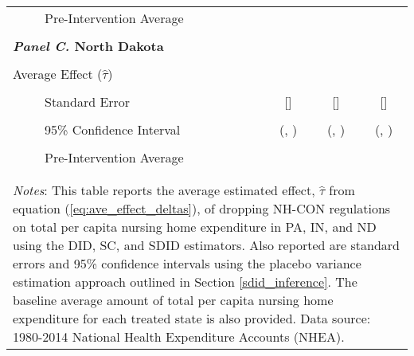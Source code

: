 \documentclass[../Main.tex]{subfiles}
\begin{document}
\begin{table}[htbp]
\begin{tabular}{l*{3}{c}}
\\[-2ex]
\multicolumn{1}{l}{\ \ \ \ \ Pre-Intervention Average}&   \multicolumn{3}{c}{}\\
\\[-.1ex]
\multicolumn{4}{l}{\textbf{\textit{Panel C.} North Dakota}}\\
\\[-1.5ex]
\multicolumn{1}{l}{Average Effect ($\hat{\tau}$)}&   \multicolumn{1}{c}{}&   \multicolumn{1}{c}{}&  \multicolumn{1}{c}{}\\
\\[-2ex]
\multicolumn{1}{l}{\ \ \ \ \ Standard Error}  &\multicolumn{1}{c}{[]}&\multicolumn{1}{c}{[]}&\multicolumn{1}{c}{[]}\\
\\[-2ex]
\multicolumn{1}{l}{\ \ \ \ \ 95\% Confidence Interval}&   \multicolumn{1}{c}{(, )}&   \multicolumn{1}{c}{(, )}&   \multicolumn{1}{c}{(, )}\\
\\[-2ex]
\multicolumn{1}{l}{\ \ \ \ \ Pre-Intervention Average}&   \multicolumn{3}{c}{}\\
\\[-.1ex]
\hline\hline
\\[-2ex]
\multicolumn{4}{p{.69\linewidth}}{\footnotesize \textit{Notes}: This table reports the average estimated effect, $\hat{\tau}$ from equation (\ref{eq:ave_effect_deltas}), of dropping NH-CON regulations on total per capita nursing home expenditure in PA, IN, and ND using the DID, SC, and SDID estimators. Also reported are standard errors and 95\% confidence intervals using the placebo variance estimation approach outlined in Section \ref{sdid_inference}. The baseline average amount of total per capita nursing home expenditure for each treated state is also provided. Data source: 1980-2014 National Health Expenditure Accounts (NHEA).}
\end{tabular}
\end{table}
\vfill
\clearpage
\end{document}
